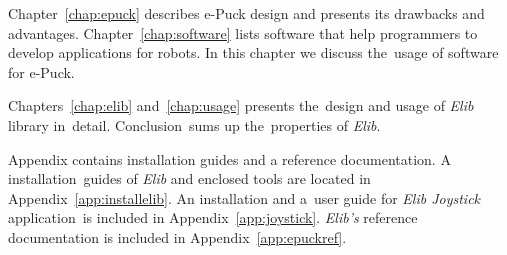   Chapter~\ref{chap:epuck} describes e-Puck design and presents its drawbacks and advantages.
  Chapter~\ref{chap:software} lists software that help programmers to develop applications for robots.
  In this chapter we discuss the~usage of software for e-Puck. 
  
  Chapters~\ref{chap:elib} and~\ref{chap:usage} presents the~design and usage of {\it Elib} library in~detail.
  Conclusion~sums up the~properties of {\it Elib}.

  Appendix contains installation guides and a reference documentation. 
  A installation~guides of {\it Elib} and enclosed tools are located in Appendix~\ref{app:installelib}. 
  An installation and a~user guide for {\it Elib Joystick} application~is included in Appendix~\ref{app:joystick}. 
  {\it Elib's} reference documentation is included in Appendix~\ref{app:epuckref}.


